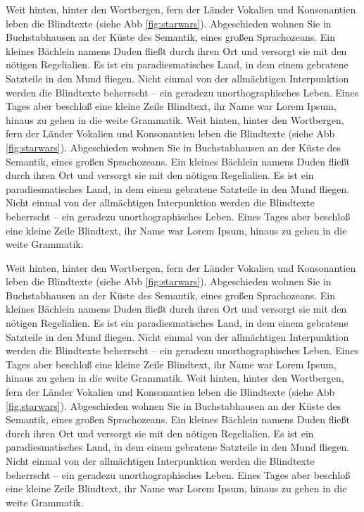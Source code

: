 Weit hinten, hinter den Wortbergen, fern der Länder Vokalien und Konsonantien leben die Blindtexte (siehe Abb \ref{fig:starwars}). Abgeschieden wohnen Sie in Buchstabhausen an der Küste des Semantik, eines großen Sprachozeans. Ein kleines Bächlein namens Duden fließt durch ihren Ort und versorgt sie mit den nötigen Regelialien. Es ist ein paradiesmatisches Land, in dem einem gebratene Satzteile in den Mund fliegen. Nicht einmal von der allmächtigen Interpunktion werden die Blindtexte beherrscht – ein geradezu unorthographisches Leben. Eines Tages aber beschloß eine kleine Zeile Blindtext, ihr Name war Lorem Ipsum, hinaus zu gehen in die weite Grammatik.
Weit hinten, hinter den Wortbergen, fern der Länder Vokalien und Konsonantien leben die Blindtexte (siehe Abb \ref{fig:starwars}). Abgeschieden wohnen Sie in Buchstabhausen an der Küste des Semantik, eines großen Sprachozeans. Ein kleines Bächlein namens Duden fließt durch ihren Ort und versorgt sie mit den nötigen Regelialien. Es ist ein paradiesmatisches Land, in dem einem gebratene Satzteile in den Mund fliegen. Nicht einmal von der allmächtigen Interpunktion werden die Blindtexte beherrscht – ein geradezu unorthographisches Leben. Eines Tages aber beschloß eine kleine Zeile Blindtext, ihr Name war Lorem Ipsum, hinaus zu gehen in die weite Grammatik.

Weit hinten, hinter den Wortbergen, fern der Länder Vokalien und Konsonantien leben die Blindtexte (siehe Abb \ref{fig:starwars}). Abgeschieden wohnen Sie in Buchstabhausen an der Küste des Semantik, eines großen Sprachozeans. Ein kleines Bächlein namens Duden fließt durch ihren Ort und versorgt sie mit den nötigen Regelialien. Es ist ein paradiesmatisches Land, in dem einem gebratene Satzteile in den Mund fliegen. Nicht einmal von der allmächtigen Interpunktion werden die Blindtexte beherrscht – ein geradezu unorthographisches Leben. Eines Tages aber beschloß eine kleine Zeile Blindtext, ihr Name war Lorem Ipsum, hinaus zu gehen in die weite Grammatik.
Weit hinten, hinter den Wortbergen, fern der Länder Vokalien und Konsonantien leben die Blindtexte (siehe Abb \ref{fig:starwars}). Abgeschieden wohnen Sie in Buchstabhausen an der Küste des Semantik, eines großen Sprachozeans. Ein kleines Bächlein namens Duden fließt durch ihren Ort und versorgt sie mit den nötigen Regelialien. Es ist ein paradiesmatisches Land, in dem einem gebratene Satzteile in den Mund fliegen. Nicht einmal von der allmächtigen Interpunktion werden die Blindtexte beherrscht – ein geradezu unorthographisches Leben. Eines Tages aber beschloß eine kleine Zeile Blindtext, ihr Name war Lorem Ipsum, hinaus zu gehen in die weite Grammatik.

